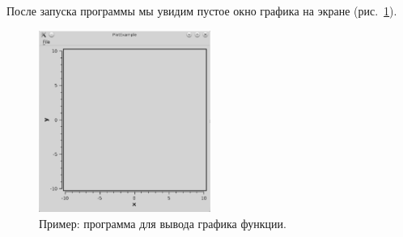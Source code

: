 После запуска программы мы увидим пустое окно графика на экране (рис.~\ref{ch15:refDrawing12}).
\begin{figure}[htb]
\begin{center}
\includegraphics[width=0.5\textwidth]{img/ris_15_13}
\caption[Пример: программа для вывода графика функции.]{Пример: программа для вывода графика функции.}
\label{ch15:refDrawing12}
\end{center}
\end{figure}

